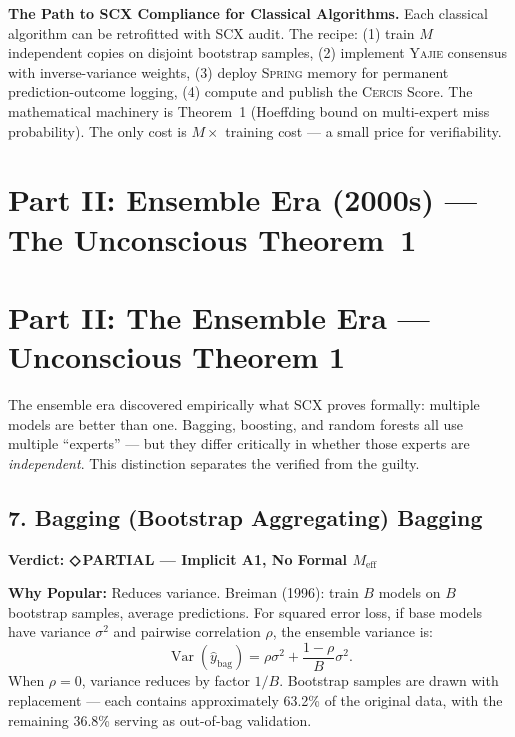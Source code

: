\documentclass[12pt,a4paper]{article}
\theoremstyle{definition}
\newcommand{\weakness}{{\color{weakcolor}\textbf{◇\,PARTIAL}}}
\newcommand{\Yajie}{\textsc{Yajie}}
\newcommand{\Spring}{\textsc{Spring}}
\newcommand{\Cercis}{\textsc{Cercis}}
\newcommand{\SCX}{\textsc{SCX}}
\DeclareMathOperator{\Var}{Var}
\newcommand{\auditHeader}[1]{\medskip\noindent\textbf{\large #1}\medskip}
\newcommand{\whyPopular}{\noindent\textbf{Why Popular:} }
\begin{document}
\noindent\textbf{The Path to SCX Compliance for Classical Algorithms.} Each classical algorithm can be retrofitted with \SCX{} audit. The recipe: (1) train $M$ independent copies on disjoint bootstrap samples, (2) implement \Yajie{} consensus with inverse-variance weights, (3) deploy \Spring{} memory for permanent prediction-outcome logging, (4) compute and publish the \Cercis{} Score. The mathematical machinery is Theorem~1 (Hoeffding bound on multi-expert miss probability). The only cost is $M \times$ training cost — a small price for verifiability.

\section{Part II: Ensemble Era (2000s) — The Unconscious Theorem~1}
\section{Part II: The Ensemble Era --- Unconscious Theorem 1}
\label{sec:ensemble}

The ensemble era discovered empirically what \SCX{} proves formally: multiple models are better than one. Bagging, boosting, and random forests all use multiple ``experts'' — but they differ critically in whether those experts are \textit{independent}. This distinction separates the verified from the guilty.

\subsection{7. Bagging (Bootstrap Aggregating) Bagging}

\auditHeader{Verdict: \weakness{} — Implicit A1, No Formal $M_{\text{eff}}$}

\whyPopular{} Reduces variance. Breiman (1996): train $B$ models on $B$ bootstrap samples, average predictions. For squared error loss, if base models have variance $\sigma^2$ and pairwise correlation $\rho$, the ensemble variance is:
\[
\Var(\hat{y}_{\text{bag}}) = \rho\sigma^2 + \frac{1-\rho}{B}\sigma^2.
\]
When $\rho = 0$, variance reduces by factor $1/B$. Bootstrap samples are drawn with replacement — each contains approximately 63.2\% of the original data, with the remaining 36.8\% serving as out-of-bag validation.
\end{document}
